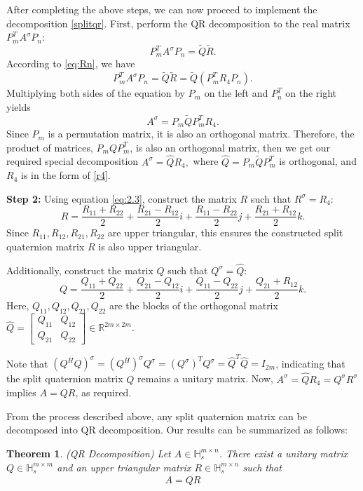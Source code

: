 \documentclass[5p,10pt]{elsarticle}
\newtheorem{theorem}{Theorem}[section]
\numberwithin{equation}{section}
\begin{document}
After completing the above steps, we can now proceed to implement the decomposition \eqref{splitqr}.
First, perform the QR decomposition to the real matrix $P_m^TA^\sigma P_{n}$:
\[P_m^TA^\sigma P_n = \tilde{Q}\tilde{R}.\]
According to \eqref{eq:Rn}, we have
\[P_m^TA^\sigma P_n = \tilde{Q}\tilde{R} = \tilde{Q}(P_m^TR_4P_n).\]
Multiplying both sides of the equation by $P_m$ on the left and $P_n^T$ on the right yields
\[A^\sigma=P_m\tilde{Q}P_m^T R_4.\]
Since $P_m$ is a permutation matrix, it is also an orthogonal matrix. Therefore, the product of matrices, $P_mQP_m^T$, is also an orthogonal matrix, then we get our required special decomposition $A^\sigma=\hat{Q}R_4,$ where $\hat{Q}=P_m\tilde{Q}P_m^T$ is orthogonal, and $R_4$ is in the form of \eqref{r4}.

\textbf{Step 2:} Using equation \eqref{eq:2.3}, construct the matrix $R$ such that $R^\sigma=R_4:$
$$
R = \frac{R_{11} + R_{22}}{2} + \frac{R_{21} - R_{12}}{2}i + \frac{R_{11} - R_{22}}{2}j + \frac{R_{21} + R_{12}}{2}k.
$$
Since $R_{11}, R_{12}, R_{21}, R_{22}$ are upper triangular, this ensures the constructed split quaternion matrix $R$ is also upper triangular.


Additionally, construct the matrix $Q$ such that $Q^\sigma=\hat{Q}:$
$$
Q = \frac{Q_{11} + Q_{22}}{2} + \frac{Q_{21} - Q_{12}}{2}i + \frac{Q_{11} - Q_{22}}{2}j + \frac{Q_{21} + R_{12}}{2}k.
$$
Here,  $Q_{11}, 
 Q_{12}, Q_{21}, Q_{22}$ are the blocks of the orthogonal matrix $\hat{Q} = \begin{bmatrix} Q_{11} & Q_{12} \\ Q_{21} & Q_{22} \end{bmatrix} \in \mathbb{
 R}^{2m \times 2m}$.

Note that $(Q^H Q)^\sigma = {(Q^H)}^\sigma Q^\sigma = {(Q^\sigma)}^TQ^\sigma = \hat{Q}^T\hat{Q} = I_{2m}$, indicating that the split quaternion matrix $Q$ remains a unitary matrix.
Now, $A^\sigma=\hat{Q}R_4=Q^\sigma R^\sigma$ implies
$A = Q R$, as required.

From the process described above,  any split quaternion matrix can be decomposed into QR decomposition. Our results can be summarized as follows:
\begin{theorem}(QR Decomposition)
    Let $A \in \mathbb{H}_s^{m \times n}$. There exist a unitary matrix $Q \in \mathbb{H}_s^{m \times m}$ and an upper triangular matrix $R \in \mathbb{H}_s^{m \times n}$ such that
    \begin{eqnarray}\label{eq:split QR}
        A = Q R
    \end{eqnarray}
\end{theorem}
\end{document}
